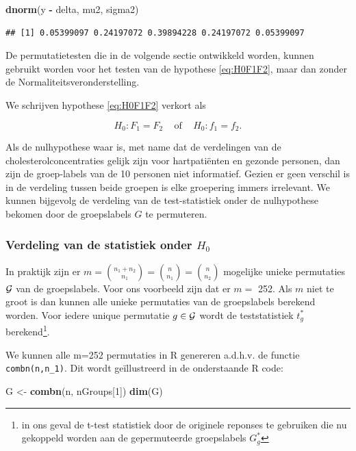 \documentclass[
  12pt,dutch]{book}
\newenvironment{Shaded}{\begin{snugshade}}{\end{snugshade}}
\newcommand{\DecValTok}[1]{\textcolor[rgb]{0.00,0.00,0.81}{#1}}
\newcommand{\FunctionTok}[1]{\textcolor[rgb]{0.13,0.29,0.53}{\textbf{#1}}}
\newcommand{\NormalTok}[1]{#1}
\newcommand{\OtherTok}[1]{\textcolor[rgb]{0.56,0.35,0.01}{#1}}
\newcommand{\SpecialCharTok}[1]{\textcolor[rgb]{0.81,0.36,0.00}{\textbf{#1}}}
\theoremstyle{definition}
\theoremstyle{definition}
\theoremstyle{definition}
\theoremstyle{definition}
\theoremstyle{remark}
\begin{document}
\begin{Shaded}
\begin{Highlighting}[]
\FunctionTok{dnorm}\NormalTok{(y }\SpecialCharTok{{-}}\NormalTok{ delta, mu2, sigma2)}
\end{Highlighting}
\end{Shaded}

\begin{verbatim}
## [1] 0.05399097 0.24197072 0.39894228 0.24197072 0.05399097
\end{verbatim}

De permutatietesten die in de volgende sectie ontwikkeld worden, kunnen gebruikt worden voor het testen van de hypothese \eqref{eq:H0F1F2}, maar dan zonder de Normaliteitsveronderstelling.

We schrijven hypothese \eqref{eq:H0F1F2} verkort als

\[
  H_0: F_1=F_2 \;\;\;\text{ of }\;\;\; H_0:f_1=f_2.
\]

Als de nulhypothese waar is, met name dat de verdelingen van de cholesterolconcentraties gelijk zijn voor hartpatiënten en gezonde personen, dan zijn de groep-labels van de 10 personen niet informatief.
Gezien er geen verschil is in de verdeling tussen beide groepen is elke groepering immers irrelevant.
We kunnen bijgevolg de verdeling van de test-statistiek onder de nulhypothese bekomen door de groepslabels \(G\) te permuteren.

\subsubsection{\texorpdfstring{Verdeling van de statistiek onder \(H_0\)}{Verdeling van de statistiek onder H\_0}}\label{verdeling-van-de-statistiek-onder-h_0}

In praktijk zijn er \(m=\binom{n_1+n_2}{n_1}=\binom{n}{n_1}=\binom{n}{n_2}\) mogelijke unieke permutaties \(\cal{G}\) van de groepslabels.
Voor ons voorbeeld zijn dat er \(m=\) 252.
Als \(m\) niet te groot is dan kunnen alle unieke permutaties van de groepslabels berekend worden.
Voor iedere unique permutatie \(g \in \cal{G}\) wordt de teststatistiek \(t^*_g\) berekend\footnote{in ons geval de t-test statistiek door de originele reponses te gebruiken die nu gekoppeld worden aan de gepermuteerde groepslabels \(G_g^*\)}.

We kunnen alle m=252 permutaties in R genereren a.d.h.v. de functie \texttt{combn(n,n\_1)}.
Dit wordt geïllustreerd in de onderstaande R code:

\begin{Shaded}
\begin{Highlighting}[]
\NormalTok{G }\OtherTok{\textless{}{-}} \FunctionTok{combn}\NormalTok{(n, nGroups[}\DecValTok{1}\NormalTok{])}
\FunctionTok{dim}\NormalTok{(G)}
\end{Highlighting}
\end{Shaded}
\end{document}
